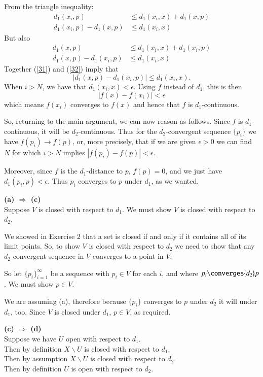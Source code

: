 \documentclass{homework}
\begin{document}
From the triangle inequality:
\begin{align}
d_1(x_i,p) &\le d_1(x_i,x) + d_1(x,p) \nonumber\\
d_1(x_i,p) - d_1(x,p) &\le d_1(x_i,x) \label{31}
\end{align}
But also
\begin{align}
d_1(x,p) &\le d_1(x_i,x) + d_1(x_i,p) \nonumber\\
d_1(x,p) - d_1(x_i,p) &\le d_1(x_i,x) \label{32}
\end{align}
Together (\ref{31}) and (\ref{32}) imply that
$$ |d_1(x,p)-d_1(x_i,p)| \le d_1(x_i,x). $$
When $i>N$, we have that $d_1(x_i,x)<\epsilon$.  Using $f$ instead of $d_1$, this
is then
$$ |f(x)-f(x_i)| < \epsilon$$
which means $f(x_i)$ converges to $f(x)$ and hence that $f$ is $d_1$-continuous.

So, returning to the main argument, we can now reason as follows.  Since $f$
is $d_1$-continuous, it will be $d_2$-continuous.
Thus for the $d_2$-convergent
sequence $\{p_i\}$ we have $f(p_i)\rightarrow f(p)$, or,
more precisely, that if we are given $\epsilon>0$ we can find $N$ for
which $i>N$ implies $|f(p_i)-f(p)|<\epsilon$.

Moreover, since $f$ is the $d_1$-distance
to $p$, $f(p)=0$, and we just have $d_1(p_i,p)<\epsilon$.
Thus $p_i$ converges to $p$
under $d_1$, as we wanted.

\textbf{(a) $\Longrightarrow$ (c)}\\
Suppose $V$ is closed with respect to $d_1$. We must show $V$ is
closed with respect to $d_2$.

We showed in Exercise 2 that a set is closed if and only if
it contains all of its limit
points.  So, to show $V$ is closed with respect to $d_2$ we
need to show that any $d_2$-convergent sequence in $V$ converges to
a point in $V$.

So let $\{p_i\}_{i=1}^\infty$ be a sequence with $p_i\in V$ for
each $i$, and where $p_i\converges{d_2} p$.  We must show $p\in V$.

We are assuming (a), therefore because $\{p_i\}$ converges to $p$ under $d_2$
it will under $d_1$, too.  Since $V$ is closed under $d_1$, $p\in V$, as
required.

\textbf{(c) $\Longrightarrow$ (d)}\\
Suppose we have $U$ open with respect to $d_1$.\\
Then by definition $X\backslash U$ is closed with respect to $d_1$.\\
Then by assumption $X\backslash U$ is closed with respect to $d_2$.\\
Then by definition $U$ is open with respect to $d_2$.
\end{document}
